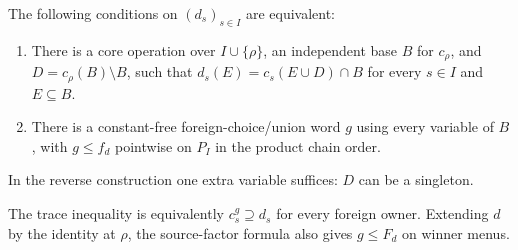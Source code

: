 \begin{theorem}
\label{core:thm:conditional-trace-minorants}
The following conditions on $(d_s)_{s\in I}$ are equivalent:
\begin{enumerate}
\item There is a core operation over $I\cup\{\rho\}$, an independent
  base $B$ for $c_\rho$, and $D=c_\rho(B)\setminus B$, such that
  $d_s(E)=c_s(E\cup D)\cap B$ for every $s\in I$ and $E\subseteq B$.
\item There is a constant-free foreign-choice/union word $g$ using
  every variable of $B$, with $g\leq f_d$ pointwise on $P_I$ in the
  product chain order.
\end{enumerate}
In the reverse construction one extra variable suffices: $D$ can
be a singleton.
\end{theorem}
The trace inequality is equivalently $c_s^g\supseteq d_s$ for every
foreign owner. Extending $d$ by the identity at $\rho$, the source-factor
formula also gives $g\leq F_d$ on winner menus.
